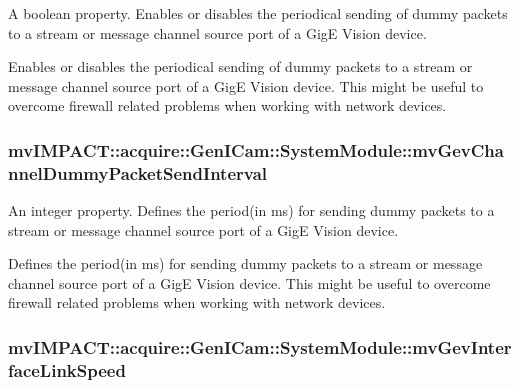 A boolean property. Enables or disables the periodical sending of dummy packets to a stream or message channel source port of a Gig\+E Vision device. 

Enables or disables the periodical sending of dummy packets to a stream or message channel source port of a Gig\+E Vision device. This might be useful to overcome firewall related problems when working with network devices. \hypertarget{classmv_i_m_p_a_c_t_1_1acquire_1_1_gen_i_cam_1_1_system_module_aa62bfd581c2017182bbd1ad4173706d2}{
\subsubsection[{mv\+Gev\+Channel\+Dummy\+Packet\+Send\+Interval}]{ mv\+I\+M\+P\+A\+C\+T\+::acquire\+::\+Gen\+I\+Cam\+::\+System\+Module\+::mv\+Gev\+Channel\+Dummy\+Packet\+Send\+Interval}}\label{classmv_i_m_p_a_c_t_1_1acquire_1_1_gen_i_cam_1_1_system_module_aa62bfd581c2017182bbd1ad4173706d2}


An integer property. Defines the period(in ms) for sending dummy packets to a stream or message channel source port of a Gig\+E Vision device. 

Defines the period(in ms) for sending dummy packets to a stream or message channel source port of a Gig\+E Vision device. This might be useful to overcome firewall related problems when working with network devices. \hypertarget{classmv_i_m_p_a_c_t_1_1acquire_1_1_gen_i_cam_1_1_system_module_a24a2d2d7fa7a6b3baf93991e108df1fb}{
\subsubsection[{mv\+Gev\+Interface\+Link\+Speed}]{ mv\+I\+M\+P\+A\+C\+T\+::acquire\+::\+Gen\+I\+Cam\+::\+System\+Module\+::mv\+Gev\+Interface\+Link\+Speed}}\label{classmv_i_m_p_a_c_t_1_1acquire_1_1_gen_i_cam_1_1_system_module_a24a2d2d7fa7a6b3baf93991e108df1fb}


